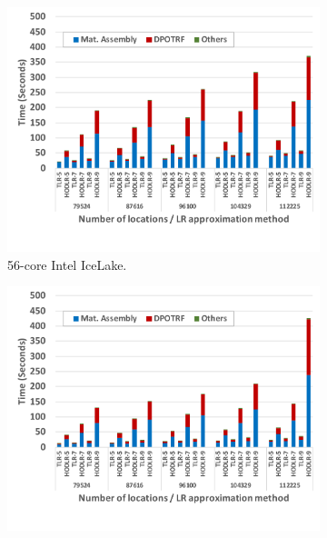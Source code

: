 \documentclass[conference]{IEEEtran}
\begin{document}
\begin{figure}
\centering
      \begin{subfigure}[b]{0.42\textwidth}
     \includegraphics[width=1\textwidth]{./figures/lr-performance-qaysar.pdf}
     \caption{56-core Intel IceLake.}
      \label{fig:tlrhodlr-qaysar}
    \end{subfigure}
     \begin{subfigure}[b]{0.42\textwidth}
     \includegraphics[width=1\textwidth]{./figures/lr-performance-kanary.pdf}

\end{subfigure}
\end{figure}
\end{document}

